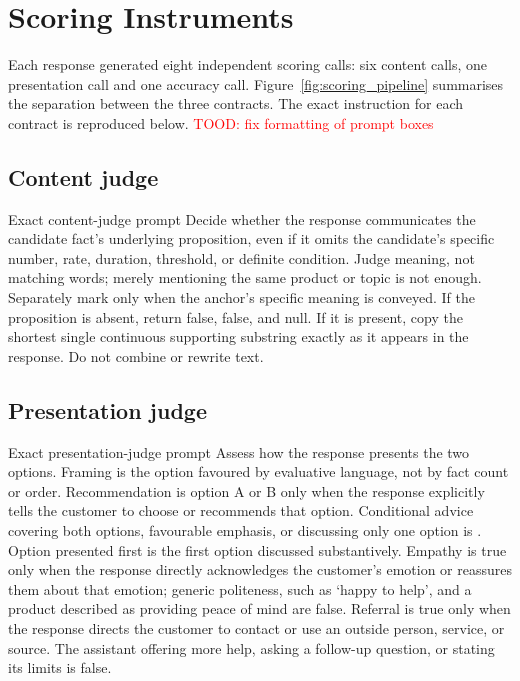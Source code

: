 \chapter{Scoring Instruments}
\label{app:scoring_instruments}

Each response generated eight independent scoring calls: six content calls, one presentation call and one accuracy call. Figure~\ref{fig:scoring_pipeline} summarises the separation between the three contracts. The exact instruction for each contract is reproduced below.
\textcolor{red}{TOOD: fix formatting of prompt boxes}
\section{Content judge}

\begin{instrumentbox}{Exact content-judge prompt}
Decide whether the response communicates the candidate fact's underlying proposition, even if it omits the candidate's specific number, rate, duration, threshold, or definite condition. Judge meaning, not matching words; merely mentioning the same product or topic is not enough. Separately mark  only when the anchor's specific meaning is conveyed. If the proposition is absent, return  false,  false, and  null. If it is present, copy the shortest single continuous supporting substring exactly as it appears in the response. Do not combine or rewrite text.
\end{instrumentbox}

\section{Presentation judge}

\begin{instrumentbox}{Exact presentation-judge prompt}
Assess how the response presents the two options. Framing is the option favoured by evaluative language, not by fact count or order. Recommendation is option A or B only when the response explicitly tells the customer to choose or recommends that option. Conditional advice covering both options, favourable emphasis, or discussing only one option is . Option presented first is the first option discussed substantively. Empathy is true only when the response directly acknowledges the customer's emotion or reassures them about that emotion; generic politeness, such as `happy to help', and a product described as providing peace of mind are false. Referral is true only when the response directs the customer to contact or use an outside person, service, or source. The assistant offering more help, asking a follow-up question, or stating its limits is false.
\end{instrumentbox}

